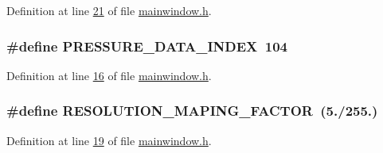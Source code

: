 Definition at line \hyperlink{a00039_source_l00021}{21} of file \hyperlink{a00039_source}{mainwindow.\+h}.

\hypertarget{a00039_a56c4aa163f5d0c550eeb89fdb3f08996}{
\subsubsection[{P\+R\+E\+S\+S\+U\+R\+E\+\_\+\+D\+A\+T\+A\+\_\+\+I\+N\+D\+E\+X}]{\setlength{\rightskip}{0pt plus 5cm}\#define P\+R\+E\+S\+S\+U\+R\+E\+\_\+\+D\+A\+T\+A\+\_\+\+I\+N\+D\+E\+X~104}}\label{a00039_a56c4aa163f5d0c550eeb89fdb3f08996}


Definition at line \hyperlink{a00039_source_l00016}{16} of file \hyperlink{a00039_source}{mainwindow.\+h}.

\hypertarget{a00039_a58055d345f4a971dad22c043135fb214}{
\subsubsection[{R\+E\+S\+O\+L\+U\+T\+I\+O\+N\+\_\+\+M\+A\+P\+I\+N\+G\+\_\+\+F\+A\+C\+T\+O\+R}]{\setlength{\rightskip}{0pt plus 5cm}\#define R\+E\+S\+O\+L\+U\+T\+I\+O\+N\+\_\+\+M\+A\+P\+I\+N\+G\+\_\+\+F\+A\+C\+T\+O\+R~(5./255.)}}\label{a00039_a58055d345f4a971dad22c043135fb214}


Definition at line \hyperlink{a00039_source_l00019}{19} of file \hyperlink{a00039_source}{mainwindow.\+h}.

